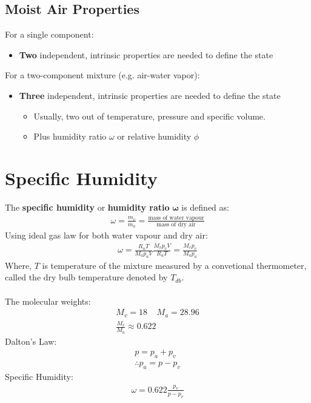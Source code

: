\subsection{Moist Air Properties}
For a single component:
\begin{itemize}[noitemsep]
  \item \textbf{Two} independent, intrinsic properties are needed to define the state
\end{itemize}
For a two-component mixture (e.g. air-water vapor):
\begin{itemize}[noitemsep]
  \item \textbf{Three} independent, intrinsic properties are needed to define the state
        \begin{itemize}[noitemsep]
          \item Usually, two out of temperature, pressure
                and specific volume.
          \item Plus humidity ratio $\omega$ or relative humidity $\phi$
        \end{itemize}
\end{itemize}
\section{Specific Humidity}
The \textbf{specific humidity} or \textbf{humidity ratio} $\mathbf{\omega}$ is defined as:
\begin{gather}
  \omega = \frac{m_v}{m_a} = \frac{\text{mass of water vapour}}{\text{mass of dry air}}
\end{gather}
Using ideal gas law for both water vapour and dry air:
\begin{gather}
  \omega = \frac{R_u T}{M_a p_a V}\frac{M_v p_v V}{R_u T} = \frac{M_v p_v}{M_a p_a}
\end{gather}
Where, $T$ is temperature of the mixture measured by a convetional thermometer, called the dry bulb temperature denoted by $T_{db}$. \\\\
The molecular weights:
\begin{gather}
  M_v = 18 \ \ \ \ \ M_a = 28.96 \\[5pt]
  \frac{M_v}{M_a} \approx 0.622
\end{gather}
Dalton’s Law:
\begin{gather}
  p = p_a + p_v \\[5pt]
  \therefore p_a = p - p_v
\end{gather}
Specific Humidity:
\begin{gather}
  \omega = 0.622\frac{p_v}{p-p_v}
\end{gather}
